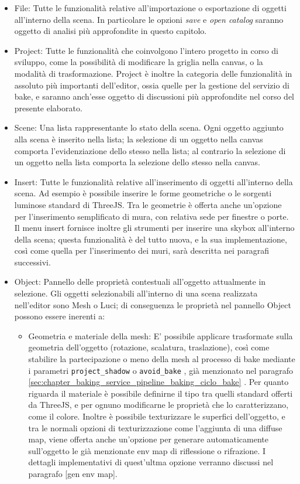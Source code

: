 \begin{itemize}
\item File: Tutte le funzionalità relative all’importazione o esportazione di oggetti all’interno della scena. In particolare le opzioni \emph{save} e \emph{open catalog} saranno oggetto di analisi più approfondite in questo capitolo.
\item Project: Tutte le funzionalità che coinvolgono l’intero progetto in corso di sviluppo, come la possibilità di modificare la griglia nella canvas, o la modalità di trasformazione. Project è inoltre la categoria delle funzionalità in assoluto più importanti dell’editor, ossia quelle per la gestione del servizio di bake, e saranno anch’esse oggetto di discussioni più approfondite nel corso del presente elaborato.
\item Scene: Una lista rappresentante lo stato della scena. Ogni oggetto aggiunto alla scena è inserito nella lista; la selezione di un oggetto nella canvas comporta l’evidenziazione dello stesso nella lista; al contrario la selezione di un oggetto nella lista comporta la selezione dello stesso nella canvas. 
\item Insert: Tutte le funzionalità relative all’inserimento di oggetti all’interno della scena. Ad esempio è possibile inserire le forme geometriche o le sorgenti luminose standard di ThreeJS. Tra le geometrie è offerta anche un’opzione per l’inserimento semplificato di mura, con relativa sede per finestre o porte.
\\
Il menu insert fornisce inoltre gli strumenti per inserire una skybox all’interno della scena; questa funzionalità è del tutto nuova, e la sua implementazione, così come quella per l’inserimento dei muri, sarà descritta nei paragrafi successivi.
\item Object: Pannello delle proprietà contestuali all’oggetto attualmente in selezione. Gli oggetti selezionabili all’interno di una scena realizzata nell’editor sono Mesh o Luci; di conseguenza le proprietà nel pannello Object possono essere inerenti a:
\begin{itemize}
\item Geometria e materiale della mesh: E’ possibile applicare trasformate sulla geometria dell’oggetto (rotazione, scalatura, traslazione), così come stabilire la partecipazione o meno della mesh al processo di bake mediante i parametri \texttt{project\_shadow} o \texttt{avoid\_bake} , già menzionato nel paragrafo \ref{sec:chapter_baking_service_pipeline_baking_ciclo_bake} . Per quanto riguarda il materiale è possibile definirne il tipo tra quelli standard offerti da ThreeJS, e per ognuno modificarne le proprietà che lo caratterizzano, come il colore. Inoltre è possibile texturizzare le superfici dell’oggetto, e tra le normali opzioni di texturizzazione come l’aggiunta di una diffuse map, viene offerta anche un’opzione per generare automaticamente sull’oggetto le già menzionate env map di riflessione o rifrazione. I dettagli implementativi di quest’ultma opzione verranno discussi nel paragrafo [gen env map].

\end{itemize}
\end{itemize}
